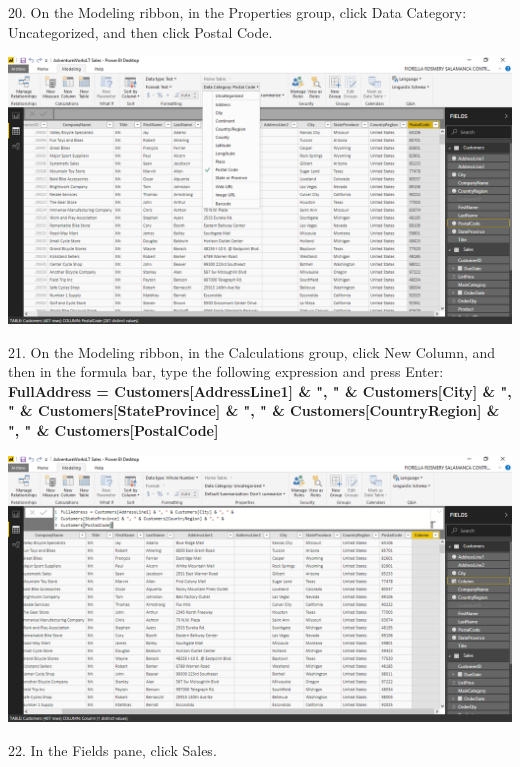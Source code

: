 20. On the Modeling ribbon, in the Properties group, click Data Category: Uncategorized, and then click Postal Code.\\

	\begin{center}
	\includegraphics[width=17cm]{./Imagenes/Ejercicio1/Tarea3/18}
	\end{center}	

21. On the Modeling ribbon, in the Calculations group, click New Column, and then in the formula bar, type the following expression and press Enter:\\

\textbf{FullAddress = Customers[AddressLine1] \& ", " \& Customers[City] \& ", " \&
Customers[StateProvince] \& ", " \& Customers[CountryRegion] \& ", " \&
Customers[PostalCode]} 

	\begin{center}
	\includegraphics[width=17cm]{./Imagenes/Ejercicio1/Tarea3/19}
	\end{center}	

22. In the Fields pane, click Sales.\\


